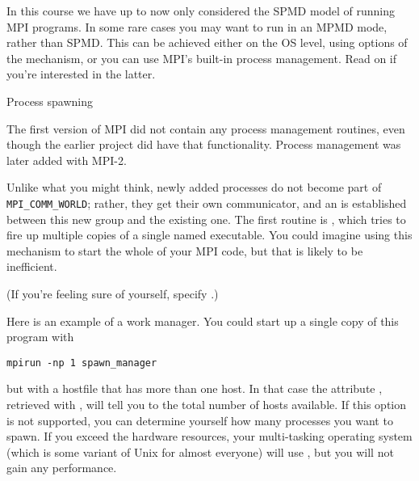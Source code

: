 
In this course we have up to now only considered the \ac{SPMD} model
of running MPI programs.  In some rare cases you may want to run in an
\ac{MPMD} mode, rather than \ac{SPMD}. This can be achieved either on
the \ac{OS} level, using options of the  mechanism,
or you can use MPI's built-in process management. Read on if you're
interested in the latter.

 {Process spawning}
\label{sec:mpi-dynamic}

The first version of MPI did not contain any process management
routines, even though the earlier  project did have
that functionality. Process management was later added with MPI-2.

Unlike what you might think, newly added processes do not become part
of \lstinline$MPI_COMM_WORLD$; rather, they get their own communicator, and an
 is established between this new group
and the existing one. The first routine is
, which tries to fire up multiple copies
of a single named executable. You could imagine using this mechanism
to start the whole of your MPI code, but that is likely to be inefficient.


(If you're feeling sure of yourself, specify .)

Here is an example of a work manager.
%
%
%
You could start up a single copy of this program with 
\begin{verbatim}
mpirun -np 1 spawn_manager
\end{verbatim}
but with a hostfile that has more than one host. In that case the
attribute , retrieved with
, will tell you to the total number of
hosts available. If this option is not supported, you can determine
yourself how many processes you want to spawn. If you exceed the
hardware resources, your multi-tasking operating system (which is some
variant of Unix for almost everyone) will use
, but you will not gain any performance.

